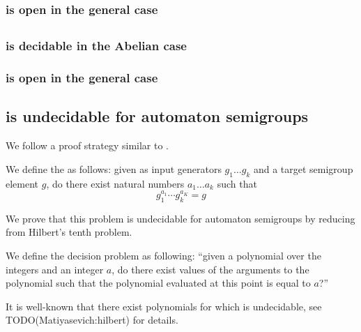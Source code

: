\documentclass[11pt]{article}
\begin{document}
\subsubsection{ is open in the general case}

\subsection{}
\subsubsection{ is decidable in the Abelian case}
\subsubsection{ is open in the general case}

\subsection{ is undecidable for automaton semigroups}
We follow a proof strategy similar to \cite{Konig15:knapsack}.

\begin{definition}
  We define the  as follows: given as input
  generators $g_1 \ldots g_k$ and a target semigroup element $g$, do
  there exist natural numbers $a_1\ldots a_k$ such that
  \[ g_1^{a_1} \cdots g_k^{a_K} = g \]
\end{definition}


We prove that this problem is undecidable for automaton semigroups by
reducing from Hilbert's tenth problem.

\begin{definition}
  We define the decision problem  as following:
  ``given a polynomial over the integers and an integer $a$, do there
  exist values of the arguments to the polynomial such that the
  polynomial evaluated at this point is equal to $a$?''
\end{definition}

It is well-known that there exist polynomials for which
 is undecidable, see TODO(Matiyasevich:hilbert) for
details.
\end{document}
